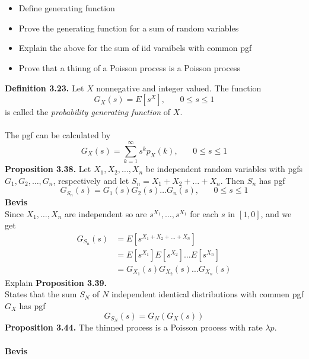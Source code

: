 \documentclass[12pt,a4paper,draft]{report}
\author{Frederik Appel Vardinghus-Nielsen}
\begin{document}
\\\\\begin{itemize}
\setlength\itemsep{0em}
\item Define generating function
\item Prove the generating function for a sum of random variables
\item Explain the above for the sum of iid varaibels with common pgf
\item Prove that a thinng of a Poisson process is a Poisson process
\end{itemize}
\textbf{Definition 3.23.} Let $X$ nonnegative and integer valued. The function
\begin{equation}
G_X(s)=E[s^X],\phantom{mm}0\leq s\leq1
\end{equation}
is called the \textit{probability generating function} of $X$.\\\\
The pgf can be calculated by
\begin{equation}
G_X(s)=\sum_{k=1}^{\infty}s^kp_X(k),\phantom{mm}0\leq s\leq1
\end{equation}
\textbf{Proposition 3.38.} Let $X_1,X_2,\ldots,X_n$ be independent random variables with pgfs $G_1,G_2,\ldots,G_n$, respectively and let $S_n=X_1+X_2+\ldots+X_n$. Then $S_n$ has pgf
\begin{equation}
G_{S_n}(s)=G_1(s)G_2(s)\ldots G_n(s),\phantom{mm}0\leq s\leq1
\end{equation}
\textbf{Bevis}\\
Since $X_1,\ldots,X_n$ are independent so are $s^{X_1},\ldots,s^{X_1}$ for each $s$ in $[1,0]$, and we get
\begin{align*}
G_{S_n}(s)&=E[s^{X_1+X_2+\ldots+X_n}]\\
&=E[s^{X_1}]E[s^{X_2}]\ldots E[s^{X_n}]\\
&=G_{X_1}(s)G_{X_2}(s)\ldots G_{X_n}(s)
\end{align*}
Explain \textbf{Proposition 3.39.}\\
States that the sum $S_N$ of $N$ independent identical distributions with commen pgf $G_X$ has pgf
\begin{equation}
G_{S_N}(s)=G_N(G_X(s))
\end{equation}
\textbf{Proposition 3.44.} The thinned process is a Poisson process with rate $\lambda p$.\\\\
\textbf{Bevis}\\
\end{document}
